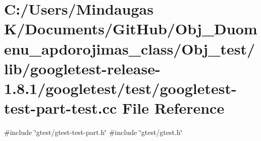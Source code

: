 \hypertarget{_obj__test_2lib_2googletest-release-1_88_81_2googletest_2test_2googletest-test-part-test_8cc}{}\section{C\+:/\+Users/\+Mindaugas K/\+Documents/\+Git\+Hub/\+Obj\+\_\+\+Duomenu\+\_\+apdorojimas\+\_\+class/\+Obj\+\_\+test/lib/googletest-\/release-\/1.8.1/googletest/test/googletest-\/test-\/part-\/test.cc File Reference}
\label{_obj__test_2lib_2googletest-release-1_88_81_2googletest_2test_2googletest-test-part-test_8cc}
{\ttfamily \#include \char`\"{}gtest/gtest-\/test-\/part.\+h\char`\"{}}\newline
{\ttfamily \#include \char`\"{}gtest/gtest.\+h\char`\"{}}\newline
